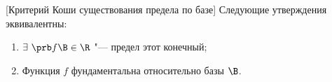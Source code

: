 [Критерий Коши существования предела по базе]\label{OKKKK}
 	Следующие утверждения эквивалентны:
 	\begin{enumerate}
 	  \item $\exists\ \prb f\B\in\R$ "--- предел этот конечный;
 	  \item Функция $f$ фундаментальна относительно базы $\B$.
 	\end{enumerate}
 